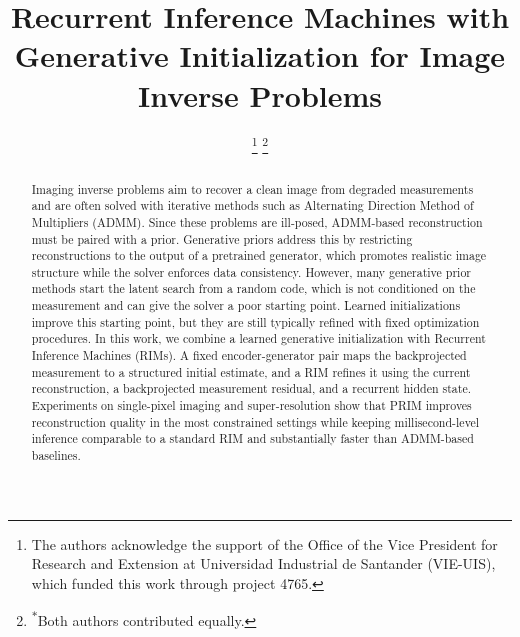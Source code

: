 \documentclass[conference]{IEEEtran}
\begin{document}
\title{Recurrent Inference Machines with Generative Initialization for Image Inverse Problems}
\author{

\thanks{The authors acknowledge the support of the Office of the Vice President for Research and Extension at Universidad Industrial de Santander (VIE-UIS), which funded this work through project 4765.}
\thanks{\textsuperscript{$\ast$}Both authors contributed equally.}
}

\maketitle

\begin{abstract}
Imaging inverse problems aim to recover a clean image from degraded measurements and are often solved with iterative methods such as Alternating Direction Method of Multipliers (ADMM). Since these problems are ill-posed, ADMM-based reconstruction must be paired with a prior. Generative priors address this by restricting reconstructions to the output of a pretrained generator, which promotes realistic image structure while the solver enforces data consistency. However, many generative prior methods start the latent search from a random code, which is not conditioned on the measurement and can give the solver a poor starting point. Learned initializations improve this starting point, but they are still typically refined with fixed optimization procedures. In this work, we combine a learned generative initialization with Recurrent Inference Machines (RIMs). A fixed encoder-generator pair maps the backprojected measurement to a structured initial estimate, and a RIM refines it using the current reconstruction, a backprojected measurement residual, and a recurrent hidden state. Experiments on single-pixel imaging and super-resolution show that PRIM improves reconstruction quality in the most constrained settings while keeping millisecond-level inference comparable to a standard RIM and substantially faster than ADMM-based baselines.
\end{abstract}
\end{document}
